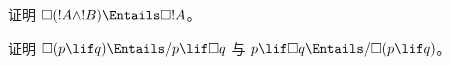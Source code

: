 \documentclass[../../../include/open-logic-section]{subfiles}
\begin{document}
\begin{prob}
  证明 $\Box (!A \land !B) \Entails \Box !A$。
\end{prob}

\begin{prob}
  证明 $\Box (p \lif q) \Entails/ p \lif \Box q$ 与 $p \lif \Box
  q \Entails/\Box (p \lif q)$。
\end{prob}
\end{document}
